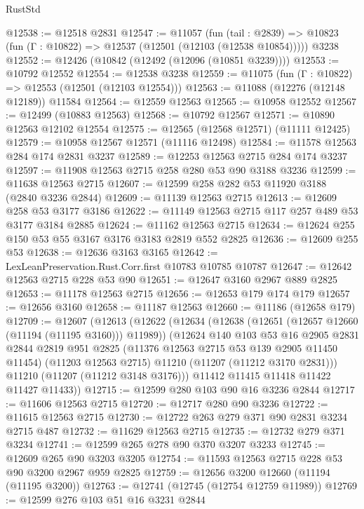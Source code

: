 \begin{lexlean}{RustStd}
\begin{coremodule}
@12538 := @12518 @2831
@12547 := @11057
    (fun (tail : @2839) => @10823 (fun (Γ : @10822) => @12537 (@12501 (@12103 (@12538 @10854)))))
    @3238
@12552 := @12426 (@10842 (@12492 (@12096 (@10851 @3239))))
@12553 := @10792 @12552
@12554 := @12538 @3238
@12559 := @11075 (fun (Γ : @10822) => @12553 (@12501 (@12103 @12554)))
@12563 := @11088 (@12276 (@12148 @12189)) @11584
@12564 := @12559 @12563
@12565 := @10958 @12552
@12567 := @12499 (@10883 @12563)
@12568 := @10792 @12567
@12571 := @10890 @12563 @12102 @12554
@12575 := @12565 (@12568 @12571) (@11111 @12425)
@12579 := @10958 @12567 @12571 (@11116 @12498)
@12584 := @11578 @12563 @284 @174 @2831 @3237
@12589 := @12253 @12563 @2715 @284 @174 @3237
@12597 := @11908 @12563 @2715 @258 @280 @53 @90 @3188 @3236
@12599 := @11638 @12563 @2715
@12607 := @12599 @258 @282 @53 @11920 @3188 (@2840 @3236 @2844)
@12609 := @11139 @12563 @2715
@12613 := @12609 @258 @53 @3177 @3186
@12622 := @11149 @12563 @2715 @117 @257 @489 @53 @3177 @3184 @2885
@12624 := @11162 @12563 @2715
@12634 := @12624 @255 @150 @53 @55 @3167 @3176 @3183 @2819 @552 @2825
@12636 := @12609 @255 @53
@12638 := @12636 @3163 @3165
@12642 := LexLeanPreservation.Rust.Corr.first @10783 @10785 @10787
@12647 := @12642 @12563 @2715 @228 @53 @90
@12651 := @12647 @3160 @2967 @889 @2825
@12653 := @11178 @12563 @2715
@12656 := @12653 @179 @174 @179
@12657 := @12656 @3160
@12658 := @11187 @12563
@12660 := @11186 (@12658 @179)
@12709 := @12607
    (@12613
      (@12622
        (@12634
          (@12638 (@12651 (@12657 @12660 (@11194 (@11195 @3160))) @11989))
          (@12624
            @140
            @103
            @53
            @16
            @2905
            @2831
            @2844
            @2819
            @951
            @2825
            (@11376 @12563 @2715 @53 @139 @2905 @11450 @11454)
            (@11203 @12563 @2715)
            @11210
            (@11207 (@11212 @3170 @2831)))
          @11210
          (@11207 (@11212 @3148 @3176)))
        @11412
        @11415
        @11418
        @11422
        @11427
        @11433))
@12715 := @12599 @280 @103 @90 @16 @3236 @2844
@12717 := @11606 @12563 @2715
@12720 := @12717 @280 @90 @3236
@12722 := @11615 @12563 @2715
@12730 := @12722 @263 @279 @371 @90 @2831 @3234 @2715 @487
@12732 := @11629 @12563 @2715
@12735 := @12732 @279 @371 @3234
@12741 := @12599 @265 @278 @90 @370 @3207 @3233
@12745 := @12609 @265 @90 @3203 @3205
@12754 := @11593 @12563 @2715 @228 @53 @90 @3200 @2967 @959 @2825
@12759 := @12656 @3200 @12660 (@11194 (@11195 @3200))
@12763 := @12741 (@12745 (@12754 @12759 @11989))
@12769 := @12599 @276 @103 @51 @16 @3231 @2844

\end{coremodule}
\end{lexlean}

